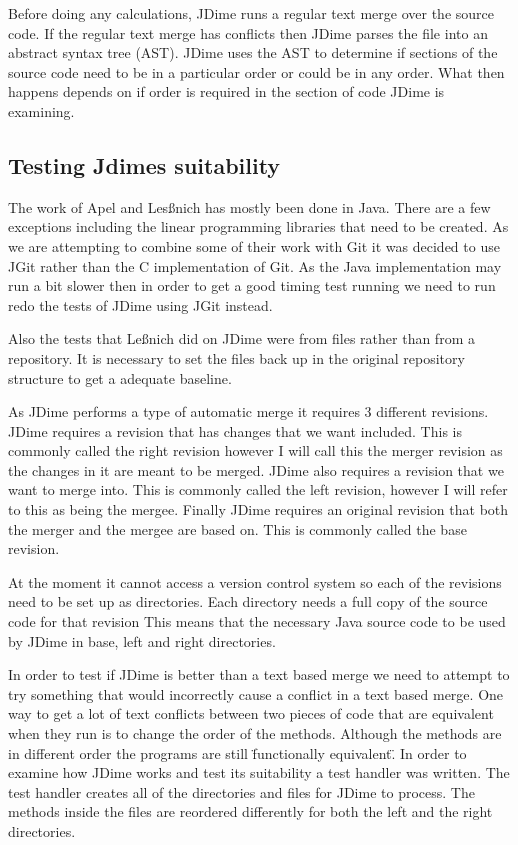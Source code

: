 Before doing any calculations, JDime runs a regular text merge over the source code.  
If the regular text merge has conflicts then JDime parses the file into an abstract syntax tree (AST).  JDime uses the AST to determine if sections of the source code need to be in a particular order or could be in any order.
What then happens depends on if order is required in the section of code JDime is examining.

\subsection{Testing Jdimes suitability}
The work of Apel and Les{\ss}nich has mostly been done in Java.  There are a few exceptions including the linear programming libraries that need to be created.  As we are attempting to combine some of their work with Git it was decided to use JGit rather than the C implementation of Git. As the Java implementation may run a bit slower then in order to get a good timing test running we need to run redo the tests of JDime using JGit instead. 

Also the tests that Le{\ss}nich did on JDime were from files rather than from a repository. It is necessary to set the files back up in the original repository structure to get a adequate baseline.

As JDime performs a type of automatic merge it requires 3 different revisions.
JDime requires a revision that has changes that we want included.  This is commonly called the right revision however I will call this the merger revision as the changes in it are meant to be merged.
JDime also requires a revision that we want to merge into.  This is commonly called the left revision, however I will refer to this as being the mergee. 
Finally JDime requires an original revision that both the merger and the mergee are based on.
This is commonly called the base revision.

At the moment it cannot access a version control system so each of the revisions need to be set up as directories.
Each directory needs a full copy of the source code for that revision 
This means that the necessary Java source code to be used by JDime in base, left and right directories.


In order to test if JDime is better than a text based merge we need to attempt to try something that would incorrectly cause a conflict in a text based merge.
One way to get a lot of text conflicts between two pieces of code that are equivalent when they run is to change the order of the methods.
Although the methods are in different order the programs are still \"functionally equivalent\".
In order to examine how JDime works and test its suitability a test handler was written.
The test handler creates all of the directories and files for JDime to process.
The methods inside the files are reordered differently for both the left and the right directories.

